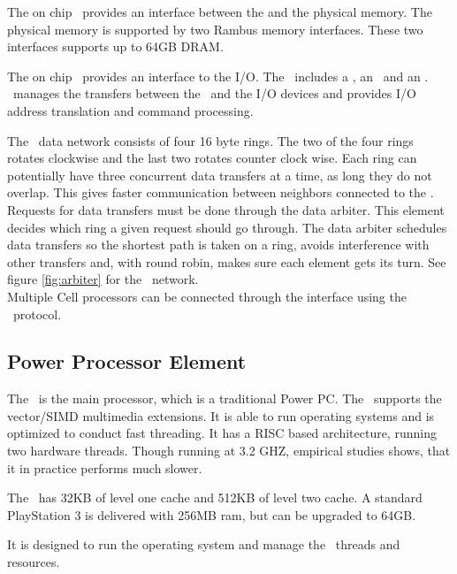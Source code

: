The on chip \MIC\ provides an interface between the \EIB{} and the
physical memory. The physical memory is supported by two Rambus memory
interfaces. These two interfaces supports up to 64GB DRAM.

The on chip \BEI\ provides an interface to the I/O. The \BEI\ includes
a \BIC{}, an \IIC\ and an \IOC{}. \BEI\ manages the transfers between
the \EIB\ and the I/O devices and provides I/O address translation and
command processing.


The \EIB\ data network consists of four 16 byte rings. The two of the
four rings rotates clockwise and the last two rotates counter clock
wise. Each ring can potentially have three concurrent data transfers
at a time, as long they do not overlap. This gives faster
communication between neighbors connected to the \EIB{}. Requests for
data transfers must be done through the data arbiter. This element
decides which ring a given request should go through. The data arbiter
schedules data transfers so the shortest path is taken on a ring,
avoids interference with other transfers and, with round robin, makes
sure each element gets its turn\cite{ibm_cell_network}. See
figure \ref{fig:arbiter} for the \EIB\ network. \\

Multiple Cell processors can be connected through
the  interface using the \BIF\ protocol.




\subsection{Power Processor Element}
\label{sec:ppe}

The \PPE\ is the main processor, which is a traditional Power PC. The
\PPU\ supports the vector/SIMD multimedia extensions. It is 
able to run operating systems and is optimized to conduct fast
threading. It has a RISC based architecture, running two hardware
threads. Though running at 3.2 GHZ, empirical studies shows, that it
in practice performs much slower.

The \PPE\ has 32KB of level one cache and 512KB of level two cache. A
standard PlayStation 3 is delivered with 256MB ram, but can be
upgraded to 64GB.

It is designed to run the operating system and manage the
\SPE\ threads and resources. 

